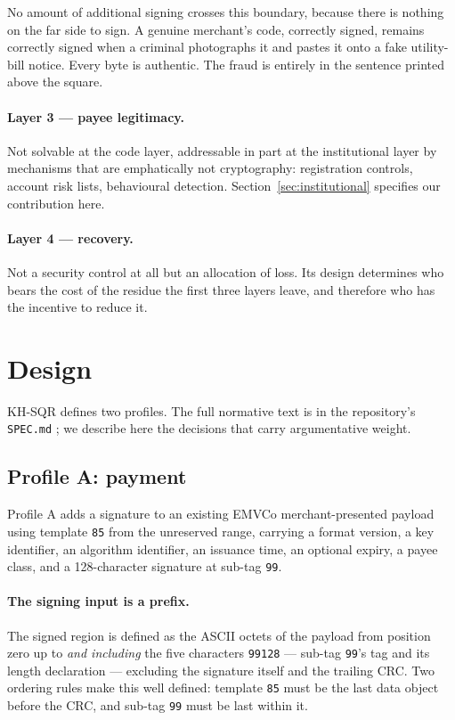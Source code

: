 \documentclass[10pt,a4paper,twocolumn]{article}
\newcommand{\code}[1]{\texttt{\small #1}}
\begin{document}
No amount of additional signing crosses this boundary, because there is nothing
on the far side to sign. A genuine merchant's code, correctly signed, remains
correctly signed when a criminal photographs it and pastes it onto a fake
utility-bill notice. Every byte is authentic. The fraud is entirely in the
sentence printed above the square.

\paragraph{Layer 3 --- payee legitimacy.}
Not solvable at the code layer, addressable in part at the institutional layer
by mechanisms that are emphatically not cryptography: registration controls,
account risk lists, behavioural detection. Section~\ref{sec:institutional}
specifies our contribution here.

\paragraph{Layer 4 --- recovery.}
Not a security control at all but an allocation of loss. Its design determines
who bears the cost of the residue the first three layers leave, and therefore
who has the incentive to reduce it.

\section{Design}
\label{sec:design}

KH-SQR defines two profiles. The full normative text is in the repository's
\code{SPEC.md} \citep{khsqr2026repo}; we describe here the decisions that carry
argumentative weight.

\subsection{Profile A: payment}
\label{sec:profileA}

Profile A adds a signature to an existing EMVCo merchant-presented payload using
template \code{85} from the unreserved range, carrying a format version, a key
identifier, an algorithm identifier, an issuance time, an optional expiry, a
payee class, and a 128-character signature at sub-tag \code{99}.

\paragraph{The signing input is a prefix.}
The signed region is defined as the ASCII octets of the payload from position
zero up to \emph{and including} the five characters \code{99128} --- sub-tag
\code{99}'s tag and its length declaration --- excluding the signature itself and
the trailing CRC. Two ordering rules make this well defined: template \code{85}
must be the last data object before the CRC, and sub-tag \code{99} must be last
within it.
\end{document}
